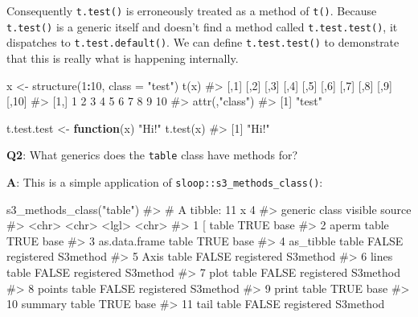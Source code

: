 \documentclass[
]{krantz}
\makeatletter
\newenvironment{Shaded}{\begin{snugshade}}{\end{snugshade}}
\newcommand{\CommentTok}[1]{\textcolor[rgb]{0.56,0.35,0.01}{\textit{#1}}}
\newcommand{\ControlFlowTok}[1]{\textcolor[rgb]{0.13,0.29,0.53}{\textbf{#1}}}
\newcommand{\DataTypeTok}[1]{\textcolor[rgb]{0.13,0.29,0.53}{#1}}
\newcommand{\DecValTok}[1]{\textcolor[rgb]{0.00,0.00,0.81}{#1}}
\newcommand{\KeywordTok}[1]{\textcolor[rgb]{0.13,0.29,0.53}{\textbf{#1}}}
\newcommand{\NormalTok}[1]{#1}
\newcommand{\OperatorTok}[1]{\textcolor[rgb]{0.81,0.36,0.00}{\textbf{#1}}}
\newcommand{\StringTok}[1]{\textcolor[rgb]{0.31,0.60,0.02}{#1}}
\newenvironment{kframe}{%
\medskip{}
\setlength{\fboxsep}{.8em}
 \def\at@end@of@kframe{}%
 \ifinner\ifhmode%
  \def\at@end@of@kframe{\end{minipage}}%
  \begin{minipage}{\columnwidth}%
 \fi\fi%
 \def\FrameCommand##1{\hskip\@totalleftmargin \hskip-\fboxsep
 \colorbox{shadecolor}{##1}\hskip-\fboxsep
     \hskip-\linewidth \hskip-\@totalleftmargin \hskip\columnwidth}%
 \MakeFramed {\advance\hsize-\width
   \@totalleftmargin\z@ \linewidth\hsize
   \@setminipage}}%
 {\par\unskip\endMakeFramed%
 \at@end@of@kframe}
\renewenvironment{Shaded}{\begin{kframe}}{\end{kframe}}
\renewcommand{\KeywordTok} [1]{\textcolor[rgb]{0.00,0.44,0.13}{{#1}}}
\renewcommand{\DataTypeTok}[1]{\textcolor[rgb]{0.56,0.13,0.00}{{#1}}}
\renewcommand{\DecValTok}  [1]{\textcolor[rgb]{0.25,0.63,0.44}{{#1}}}
\renewcommand{\StringTok}  [1]{\textcolor[rgb]{0.25,0.44,0.63}{{#1}}}
\renewcommand{\CommentTok} [1]{\textcolor[rgb]{0.38,0.63,0.69}{{#1}}}
\renewcommand{\NormalTok}  [1]{{#1}}
\makeatother
\begin{document}
Consequently \texttt{t.test()} is erroneously treated as a method of \texttt{t()}. Because \texttt{t.test()} is a generic itself and doesn't find a method called \texttt{t.test.test()}, it dispatches to \texttt{t.test.default()}. We can define \texttt{t.test.test()} to demonstrate that this is really what is happening internally.

\begin{Shaded}
\begin{Highlighting}[]
\NormalTok{x <-}\StringTok{ }\KeywordTok{structure}\NormalTok{(}\DecValTok{1}\OperatorTok{:}\DecValTok{10}\NormalTok{, }\DataTypeTok{class =} \StringTok{"test"}\NormalTok{)}
\KeywordTok{t}\NormalTok{(x)}
\CommentTok{#>      [,1] [,2] [,3] [,4] [,5] [,6] [,7] [,8] [,9] [,10]}
\CommentTok{#> [1,]    1    2    3    4    5    6    7    8    9    10}
\CommentTok{#> attr(,"class")}
\CommentTok{#> [1] "test"}

\NormalTok{t.test.test <-}\StringTok{ }\ControlFlowTok{function}\NormalTok{(x) }\StringTok{"Hi!"}
\KeywordTok{t.test}\NormalTok{(x)}
\CommentTok{#> [1] "Hi!"}
\end{Highlighting}
\end{Shaded}

\textbf{{Q2}}: What generics does the \texttt{table} class have methods for?

\textbf{{A}}: This is a simple application of \texttt{sloop::s3\_methods\_class()}:

\begin{Shaded}
\begin{Highlighting}[]
\KeywordTok{s3_methods_class}\NormalTok{(}\StringTok{"table"}\NormalTok{)}
\CommentTok{#> # A tibble: 11 x 4}
\CommentTok{#>    generic       class visible source             }
\CommentTok{#>    <chr>         <chr> <lgl>   <chr>              }
\CommentTok{#>  1 [             table TRUE    base               }
\CommentTok{#>  2 aperm         table TRUE    base               }
\CommentTok{#>  3 as.data.frame table TRUE    base               }
\CommentTok{#>  4 as_tibble     table FALSE   registered S3method}
\CommentTok{#>  5 Axis          table FALSE   registered S3method}
\CommentTok{#>  6 lines         table FALSE   registered S3method}
\CommentTok{#>  7 plot          table FALSE   registered S3method}
\CommentTok{#>  8 points        table FALSE   registered S3method}
\CommentTok{#>  9 print         table TRUE    base               }
\CommentTok{#> 10 summary       table TRUE    base               }
\CommentTok{#> 11 tail          table FALSE   registered S3method}
\end{Highlighting}
\end{Shaded}
\end{document}
